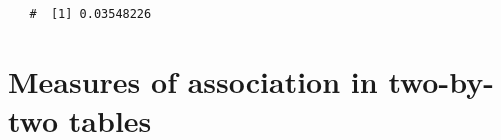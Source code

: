 \documentclass[letterpaper,12pt,twoside,]{pinp}
\begin{document}
\begin{enumerate}
\begin{Shaded}
\begin{Highlighting}[]
 \NormalTok{)}\OperatorTok{$}
\end{Highlighting}
\end{Shaded}

  \begin{ShadedResult}
   \begin{verbatim}
   #  [1] 0.03548226
   \end{verbatim}
   \end{ShadedResult}
\end{enumerate}

\newpage

\hypertarget{measures-of-association-in-two-by-two-tables}{%
\section{Measures of association in two-by-two
tables}\label{measures-of-association-in-two-by-two-tables}}
\end{document}
